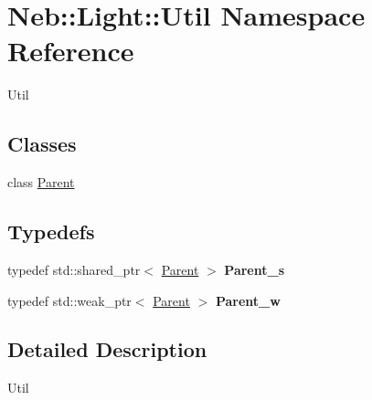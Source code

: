 \hypertarget{namespaceNeb_1_1Light_1_1Util}{\section{Neb\-:\-:Light\-:\-:Util Namespace Reference}
\label{namespaceNeb_1_1Light_1_1Util}
}


Util  


\subsection*{Classes}
\begin{DoxyCompactItemize}
\item 
class \hyperlink{classNeb_1_1Light_1_1Util_1_1Parent}{Parent}
\end{DoxyCompactItemize}
\subsection*{Typedefs}
\begin{DoxyCompactItemize}
\item 
\hypertarget{namespaceNeb_1_1Light_1_1Util_a85920a3e5b51d7914c132774cf0af5d3}{typedef std\-::shared\-\_\-ptr$<$ \hyperlink{classNeb_1_1Light_1_1Util_1_1Parent}{Parent} $>$ {\bfseries Parent\-\_\-s}}\label{namespaceNeb_1_1Light_1_1Util_a85920a3e5b51d7914c132774cf0af5d3}

\item 
\hypertarget{namespaceNeb_1_1Light_1_1Util_af86fc1f65586912c856bd58efacf1e0f}{typedef std\-::weak\-\_\-ptr$<$ \hyperlink{classNeb_1_1Light_1_1Util_1_1Parent}{Parent} $>$ {\bfseries Parent\-\_\-w}}\label{namespaceNeb_1_1Light_1_1Util_af86fc1f65586912c856bd58efacf1e0f}

\end{DoxyCompactItemize}


\subsection{Detailed Description}
Util 